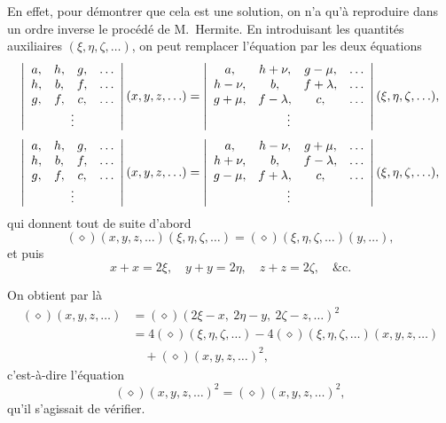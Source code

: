 \documentclass[11pt,a4paper]{article}
\begin{document}
En effet, pour d\'emontrer que cela est une solution, on n'a qu'\`a reproduire dans un ordre inverse le proc\'ed\'e de M.~Hermite. En introduisant les quantit\'es auxiliaires $(\xi,\eta,\zeta,\ldots)$, on peut remplacer l'\'equation par les deux \'equations
\begin{align*}
\left\lvert\begin{array}{cccc}
a, & h, & g, & \ldots\\
h, & b, & f, & \ldots\\
g, & f, & c, & \ldots\\
\multicolumn{4}{c}{\vdots}
\end{array}\right\rvert (x,y,z,\ldots) &=
\left\lvert\begin{array}{cccc}
a, & h + \nu, & g - \mu, & \ldots\\
h - \nu, & b, & f + \lambda, & \ldots\\
g + \mu, & f - \lambda, & c, & \ldots\\
\multicolumn{4}{c}{\vdots}
\end{array}\right\rvert (\xi,\eta,\zeta,\ldots),\\[1mm]
\left\lvert\begin{array}{cccc}
a, & h, & g, & \ldots\\
h, & b, & f, & \ldots\\
g, & f, & c, & \ldots\\
\multicolumn{4}{c}{\vdots}
\end{array}\right\rvert (x,y,z,\ldots) &=
\left\lvert\begin{array}{cccc}
a, & h - \nu, & g + \mu, & \ldots\\
h + \nu, & b, & f - \lambda, & \ldots\\
g - \mu, & f + \lambda, & c, & \ldots\\
\multicolumn{4}{c}{\vdots}
\end{array}\right\rvert (\xi,\eta,\zeta,\ldots),
\end{align*}
qui donnent tout de suite d'abord
\[
(\diamond)(x,y,z,\ldots)(\xi,\eta,\zeta,\ldots) = (\diamond)(\xi,\eta,\zeta,\ldots) (y,\ldots),
\]
et puis
\[
x + x = 2\xi,\quad y + y = 2\eta,\quad z + z = 2\zeta,\quad\&\mathrm{c}.
\]

\medskip

On obtient par l\`a
\begin{align*}
(\diamond)(x,y,z,\ldots) &= (\diamond)(2\xi - x,\ 2\eta - y,\ 2\zeta - z,\ldots)^2\\
&= 4(\diamond)(\xi,\eta,\zeta,\ldots) - 4(\diamond)(\xi,\eta,\zeta,\ldots)(x,y,z,\ldots)\\
&\quad + (\diamond)(x,y,z,\ldots)^2,
\end{align*}
c'est-\`a-dire l'\'equation
\[
(\diamond)(x,y,z,\ldots)^2 = (\diamond)(x,y,z,\ldots)^2,
\]
qu'il s'agissait de v\'erifier.
\end{document}
